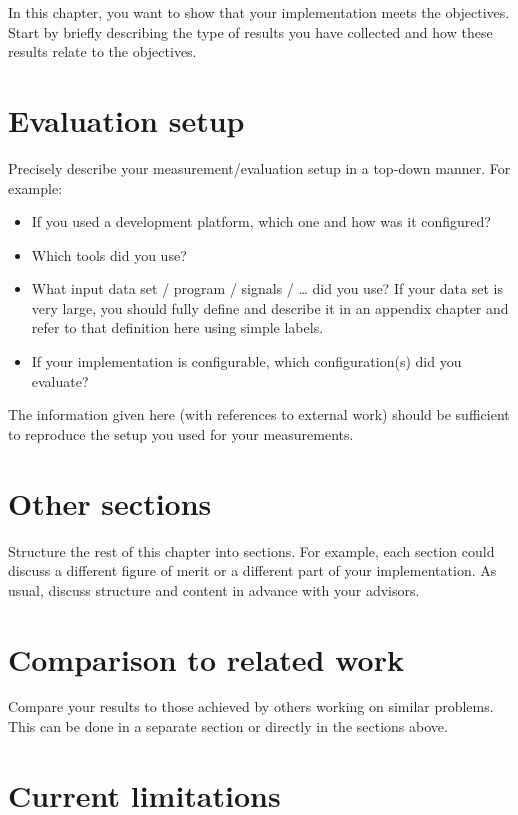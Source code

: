 In this chapter, you want to show that your implementation meets the objectives.
Start by briefly describing the type of results you have collected and how these results relate to the objectives.

\section{Evaluation setup}

Precisely describe your measurement/evaluation setup in a top-down manner.
For example:
\begin{itemize}
  \item If you used a development platform, which one and how was it configured?
  \item Which tools did you use?
  \item What input data set / program / signals / \ldots{} did you use?
    If your data set is very large, you should fully define and describe it in an appendix chapter and refer to that definition here using simple labels.
  \item If your implementation is configurable, which configuration(s) did you evaluate?
\end{itemize}

The information given here (with references to external work) should be sufficient to reproduce the setup you used for your measurements.

\section{Other sections}

Structure the rest of this chapter into sections.
For example, each section could discuss a different figure of merit or a different part of your implementation.
As usual, discuss structure and content in advance with your advisors.

\section{Comparison to related work}

Compare your results to those achieved by others working on similar problems.
This can be done in a separate section or directly in the sections above.

\section{Current limitations}

